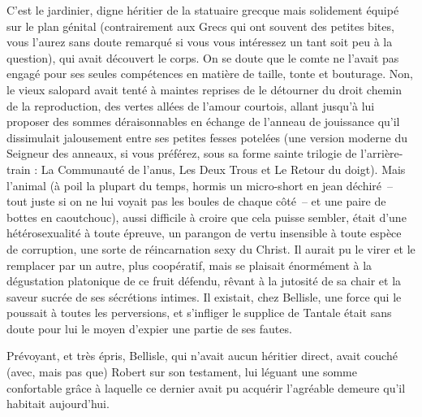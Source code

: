 \illusloflabel{}%
C’est le jardinier, digne héritier de la statuaire grecque mais solidement équipé sur le plan génital (contrairement aux Grecs qui ont souvent des petites bites, vous l’aurez sans doute remarqué si vous vous intéressez un tant soit peu à la question), qui avait découvert le corps. On se doute que le comte ne l’avait pas engagé pour ses seules compétences en matière de taille, tonte et bouturage. Non, le vieux salopard avait tenté à maintes reprises de le détourner du droit chemin de la reproduction, des vertes allées de l’amour courtois, allant jusqu’à lui proposer des sommes déraisonnables en échange de l’anneau de jouissance qu’il dissimulait jalousement entre ses petites fesses potelées (une version moderne du Seigneur des anneaux, si vous préférez, sous sa forme sainte trilogie de l’arrière-train : La Communauté de l’anus, Les Deux Trous et Le Retour du doigt). Mais l’animal (à poil la plupart du temps, hormis un micro-short en jean déchiré~-- tout juste si on ne lui voyait pas les boules de chaque côté~-- et une paire de bottes en caoutchouc), aussi difficile à croire que cela puisse sembler, était d’une hétérosexualité à toute épreuve, un parangon de vertu insensible à toute espèce de corruption, une sorte de réincarnation sexy du Christ. Il aurait pu le virer et le remplacer par un autre, plus coopératif, mais se plaisait énormément à la dégustation platonique de ce fruit défendu, rêvant à la jutosité de sa chair et la saveur sucrée de ses sécrétions intimes. Il existait, chez Bellisle, une force qui le poussait à toutes les perversions, et s’infliger le supplice de Tantale était sans doute pour lui le moyen d’expier une partie de ses fautes.

Prévoyant, et très épris, Bellisle, qui n’avait aucun héritier direct, avait couché (avec, mais pas que) Robert sur son testament, lui léguant une somme confortable grâce à laquelle ce dernier avait pu acquérir l’agréable demeure qu’il habitait aujourd’hui.


